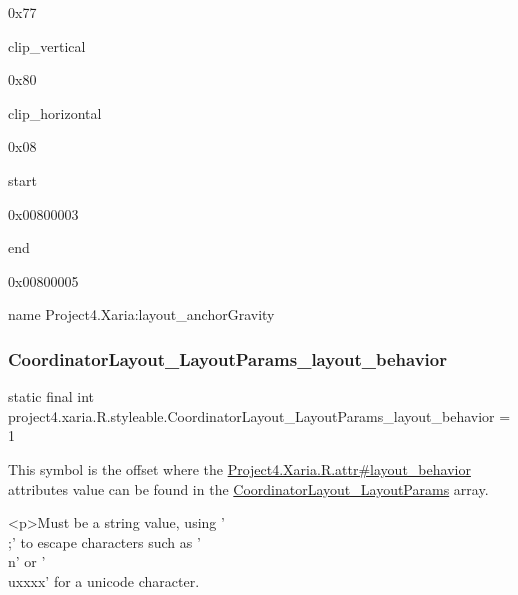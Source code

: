 0x77

{\ttfamily clip\+\_\+vertical}

0x80

{\ttfamily clip\+\_\+horizontal}

0x08

{\ttfamily start}

0x00800003

{\ttfamily end}

0x00800005

name Project4.\+Xaria\+:layout\+\_\+anchor\+Gravity \mbox{\label{classproject4_1_1xaria_1_1R_1_1styleable_a606d268587159d1993a3fa9bfaa507e2}} 
\subsubsection{\texorpdfstring{Coordinator\+Layout\+\_\+\+Layout\+Params\+\_\+layout\+\_\+behavior}{CoordinatorLayout\_LayoutParams\_layout\_behavior}}
{\footnotesize\ttfamily static final int project4.\+xaria.\+R.\+styleable.\+Coordinator\+Layout\+\_\+\+Layout\+Params\+\_\+layout\+\_\+behavior = 1\hspace{0.3cm}{\ttfamily [static]}}

This symbol is the offset where the \hyperlink{}{Project4.\+Xaria.\+R.\+attr\#layout\+\_\+behavior} attribute\textquotesingle{}s value can be found in the \hyperlink{classproject4_1_1xaria_1_1R_1_1styleable_ad7c97c688ef4dae4ebe89418a84dab5d}{Coordinator\+Layout\+\_\+\+Layout\+Params} array.

\begin{DoxyVerb}      <p>Must be a string value, using '\\;' to escape characters such as '\\n' or '\\uxxxx' for a unicode character.
\end{DoxyVerb}
 

